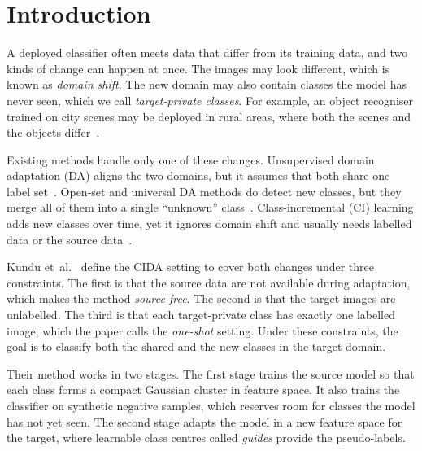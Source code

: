 \section{Introduction}\label{sec:intro}

A deployed classifier often meets data that differ from its training data, and two kinds of change can happen at once.
The images may look different, which is known as \emph{domain shift}.
The new domain may also contain classes the model has never seen, which we call \emph{target-private classes}.
For example, an object recogniser trained on city scenes may be deployed in rural areas, where both the scenes and the objects differ~\citep{kundu2020cida}.

Existing methods handle only one of these changes.
Unsupervised domain adaptation (DA) aligns the two domains, but it assumes that both share one label set~\citep{ganin2016dann}.
Open-set and universal DA methods do detect new classes, but they merge all of them into a single ``unknown'' class~\citep{saito2018osbp,liu2019sta,you2019uan}.
Class-incremental (CI) learning adds new classes over time, yet it ignores domain shift and usually needs labelled data or the source data~\citep{li2017lwf,rebuffi2017icarl,castro2018e2e,dhar2019lwm}.

Kundu et~al.~\citep{kundu2020cida} define the CIDA setting to cover both changes under three constraints.
The first is that the source data are not available during adaptation, which makes the method \emph{source-free}.
The second is that the target images are unlabelled.
The third is that each target-private class has exactly one labelled image, which the paper calls the \emph{one-shot} setting.
Under these constraints, the goal is to classify both the shared and the new classes in the target domain.

Their method works in two stages.
The first stage trains the source model so that each class forms a compact Gaussian cluster in feature space.
It also trains the classifier on synthetic negative samples, which reserves room for classes the model has not yet seen.
The second stage adapts the model in a new feature space for the target, where learnable class centres called \emph{guides} provide the pseudo-labels.

